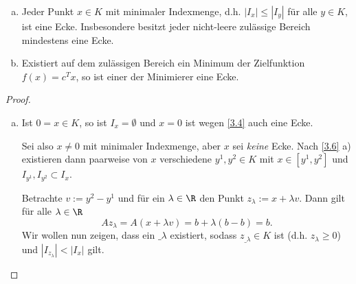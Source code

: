 \begin{lem} \label{3.8}
	\begin{enumerate}[(a)]
		\item
			Jeder Punkt $x \in K$ mit minimaler Indexmenge, d.h. $|I_x| \le |I_y|$ für alle $y \in K$, ist eine Ecke.
			Insbesondere besitzt jeder nicht-leere zulässige Bereich mindestens eine Ecke.
		\item
			Existiert auf dem zulässigen Bereich ein Minimum der Zielfunktion $f(x) = c^T x$, so ist einer der Minimierer eine Ecke.
	\end{enumerate}
	\begin{proof}
		\begin{enumerate}[(a)]
			\item
				Ist $0 = x \in K$, so ist $I_x = \emptyset$ und $x = 0$ ist wegen \ref{3.4} auch eine Ecke.

				Sei also $x \neq 0$ mit minimaler Indexmenge, aber $x$ sei \emph{keine} Ecke.
				Nach \ref{3.6} a) existieren dann paarweise von $x$ verschiedene $y^1, y^2 \in K$ mit $x \in [y^1, y^2]$ und $I_{y^1}, I_{y^2} \subset I_x$.

				Betrachte $v := y^2 - y^1$ und für ein $\lambda \in \R$ den Punkt $z_\lambda := x + \lambda v$.
				Dann gilt für alle $\lambda \in \R$
				\[
					A z_\lambda
					= A (x + \lambda v)
					= b + \lambda (b-b)
					= b.
				\]
				Wir wollen nun zeigen, dass ein $\_\lambda$ existiert, sodass $z_{\_\lambda} \in K$ ist (d.h. $z_\lambda \ge 0$) und $|I_{z_\lambda}| < |I_x|$ gilt.


\end{enumerate}
\end{proof}
\end{lem}
